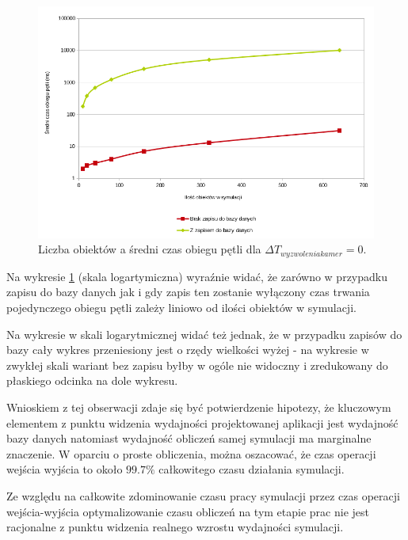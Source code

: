 \begin{figure}[!ht]
    \begin{center}
	\includegraphics[width=\textwidth,keepaspectratio]{img/wykres_2}
	\caption{Liczba obiektów a średni czas obiegu pętli dla $\Delta T_{wyzwolenia kamer} = 0$.}
	\label{ex_2_chart}
    \end{center}
\end{figure}


\par{
Na wykresie \ref{ex_2_chart} (skala logartymiczna) wyraźnie widać, że zarówno w przypadku zapisu do bazy danych jak i gdy zapis ten zostanie wyłączony czas trwania pojedynczego obiegu pętli zależy liniowo od ilości obiektów w symulacji.
}
\par{
Na wykresie w skali logarytmicznej widać też jednak, że w przypadku zapisów do bazy cały wykres przeniesiony jest o rzędy wielkości wyżej - na wykresie w zwykłej skali wariant bez zapisu byłby w ogóle nie widoczny i zredukowany do płaskiego odcinka na dole wykresu.
}
\par{
Wnioskiem z tej obserwacji zdaje się być potwierdzenie hipotezy, że kluczowym elementem z punktu widzenia wydajności projektowanej aplikacji jest wydajność bazy danych natomiast wydajność obliczeń samej symulacji ma marginalne znaczenie. W oparciu o proste obliczenia, można oszacować, że czas operacji wejścia wyjścia to około $99.7\%$ całkowitego czasu działania symulacji.
}
\par{
Ze względu na całkowite zdominowanie czasu pracy symulacji przez czas operacji wejścia-wyjścia optymalizowanie czasu obliczeń na tym etapie prac nie jest racjonalne z punktu widzenia realnego wzrostu wydajności symulacji.
}

